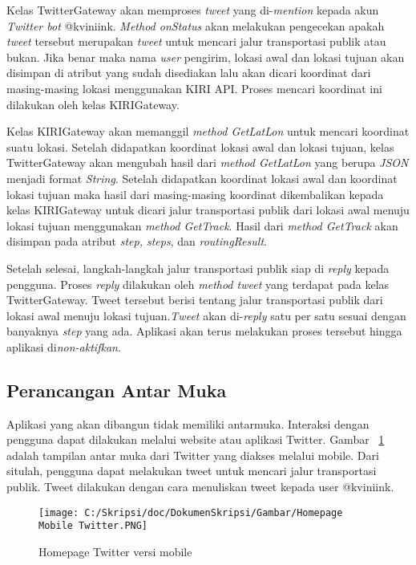 Kelas TwitterGateway akan memproses \textit{tweet} yang di-\textit{mention} kepada akun \textit{Twitter bot} @kviniink. \textit{Method onStatus} akan melakukan pengecekan apakah \textit{tweet} tersebut merupakan \textit{tweet} untuk mencari jalur transportasi publik atau bukan. Jika benar maka nama \textit{user} pengirim, lokasi awal dan lokasi tujuan akan disimpan di atribut yang sudah disediakan lalu akan dicari koordinat dari masing-masing lokasi menggunakan KIRI API. Proses mencari koordinat ini dilakukan oleh kelas KIRIGateway.

Kelas KIRIGateway akan memanggil \textit{method GetLatLon} untuk mencari koordinat suatu lokasi. Setelah didapatkan koordinat lokasi awal dan lokasi tujuan, kelas TwitterGateway akan mengubah hasil dari \textit{method GetLatLon} yang berupa \textit{JSON} menjadi format \textit{String}. Setelah didapatkan koordinat lokasi awal dan koordinat lokasi tujuan maka hasil dari masing-masing koordinat dikembalikan kepada kelas KIRIGateway untuk dicari jalur transportasi publik dari lokasi awal menuju lokasi tujuan menggunakan \textit{method GetTrack}. Hasil dari \textit{method GetTrack} akan disimpan pada atribut \textit{step, steps}, dan \textit{routingResult}.

Setelah selesai, langkah-langkah jalur transportasi publik siap di \textit{reply} kepada pengguna. Proses \textit{reply} dilakukan oleh \textit{method tweet} yang terdapat pada kelas TwitterGateway. Tweet tersebut berisi tentang jalur transportasi publik dari lokasi awal menuju lokasi tujuan.\textit{Tweet} akan di-\textit{reply} satu per satu sesuai dengan banyaknya \textit{step} yang ada. Aplikasi akan terus melakukan proses tersebut hingga aplikasi di\textit{non-aktifkan}.

\iffalse
\subsection{Perancangan Antar Muka}
Aplikasi yang akan dibangun tidak memiliki antarmuka. Interaksi dengan pengguna dapat dilakukan melalui website atau aplikasi Twitter. Gambar ~\ref{fig:Homepage Mobile Twitter} adalah tampilan antar muka dari Twitter yang diakses melalui mobile. Dari situlah, pengguna dapat melakukan tweet untuk mencari jalur transportasi publik. Tweet dilakukan dengan cara menuliskan tweet kepada user @kviniink.

\begin{figure}[htbp]
	\centering
		\texttt{[image: C:/Skripsi/doc/DokumenSkripsi/Gambar/Homepage Mobile Twitter.PNG]}
	\caption{Homepage Twitter versi mobile}
	\label{fig:Homepage Mobile Twitter}
\end{figure}

